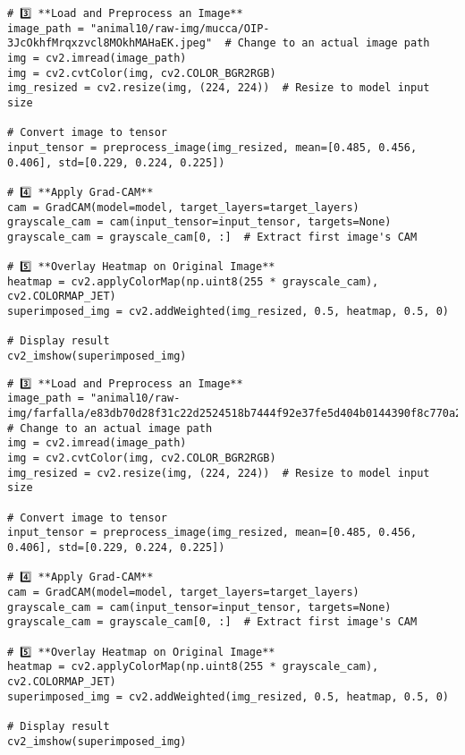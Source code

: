 \begin{verbatim}
# 3️⃣ **Load and Preprocess an Image**
image_path = "animal10/raw-img/mucca/OIP-3JcOkhfMrqxzvcl8MOkhMAHaEK.jpeg"  # Change to an actual image path
img = cv2.imread(image_path)
img = cv2.cvtColor(img, cv2.COLOR_BGR2RGB)
img_resized = cv2.resize(img, (224, 224))  # Resize to model input size

# Convert image to tensor
input_tensor = preprocess_image(img_resized, mean=[0.485, 0.456, 0.406], std=[0.229, 0.224, 0.225])

# 4️⃣ **Apply Grad-CAM**
cam = GradCAM(model=model, target_layers=target_layers)
grayscale_cam = cam(input_tensor=input_tensor, targets=None)
grayscale_cam = grayscale_cam[0, :]  # Extract first image's CAM

# 5️⃣ **Overlay Heatmap on Original Image**
heatmap = cv2.applyColorMap(np.uint8(255 * grayscale_cam), cv2.COLORMAP_JET)
superimposed_img = cv2.addWeighted(img_resized, 0.5, heatmap, 0.5, 0)

# Display result
cv2_imshow(superimposed_img)
\end{verbatim}

\begin{verbatim}
# 3️⃣ **Load and Preprocess an Image**
image_path = "animal10/raw-img/farfalla/e83db70d28f31c22d2524518b7444f92e37fe5d404b0144390f8c770a2e9b5_640.jpg"  # Change to an actual image path
img = cv2.imread(image_path)
img = cv2.cvtColor(img, cv2.COLOR_BGR2RGB)
img_resized = cv2.resize(img, (224, 224))  # Resize to model input size

# Convert image to tensor
input_tensor = preprocess_image(img_resized, mean=[0.485, 0.456, 0.406], std=[0.229, 0.224, 0.225])

# 4️⃣ **Apply Grad-CAM**
cam = GradCAM(model=model, target_layers=target_layers)
grayscale_cam = cam(input_tensor=input_tensor, targets=None)
grayscale_cam = grayscale_cam[0, :]  # Extract first image's CAM

# 5️⃣ **Overlay Heatmap on Original Image**
heatmap = cv2.applyColorMap(np.uint8(255 * grayscale_cam), cv2.COLORMAP_JET)
superimposed_img = cv2.addWeighted(img_resized, 0.5, heatmap, 0.5, 0)

# Display result
cv2_imshow(superimposed_img)
\end{verbatim}

